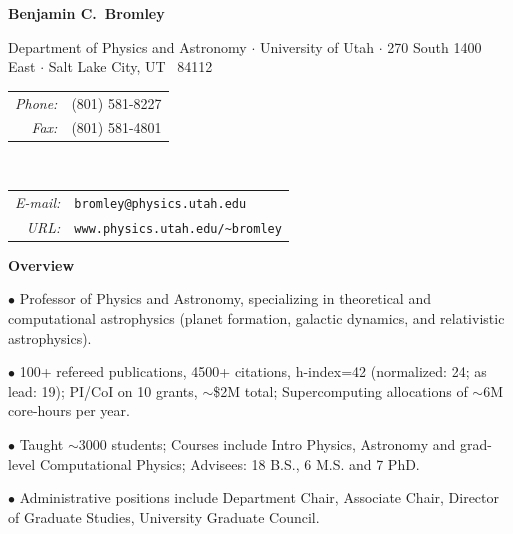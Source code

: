 \documentclass[11pt]{article}
\newcommand{\shead}[1]{\vspace{12.5pt}\centerline{{\bf{#1}}}}
\begin{document}
\vspace*{22pt}
\centerline{\large\bf Benjamin C.\ Bromley}

\vspace{-11pt}
\begin{center}
\footnotesize
Department of Physics and Astronomy $\cdot$
University of Utah
$\cdot$
270 South 1400 East $\cdot$
Salt Lake City, UT \ 84112

\vspace{-7.75pt}
\parbox[t]{1.5in}{
\begin{tabular}{rl}
{\it Phone:} & {(801) 581-8227}\\
{\it Fax:} & {(801) 581-4801}
\end{tabular}
}
\ \ \ \ \ 
\parbox[t]{3.0in}{
\begin{tabular}{rl}
{\it {E}-mail:} & {\small\tt bromley@physics.utah.edu}\\
{\it {URL}:} & {\small\tt www.physics.utah.edu/\~{}bromley}
\end{tabular}
}
\end{center}

\shead{Overview}

\hspace*{0.5in}
\begin{minipage}{5.5in}
\setlength{\parindent=-0.5in} \setlength{\leftmargin=1.0in}
$\bullet$ 
Professor of Physics and Astronomy, specializing in theoretical and
computational astrophysics (planet formation, galactic dynamics, and
relativistic astrophysics).

$\bullet$ 
100+ refereed publications, 4500+ citations, h-index=42 (normalized: 24; as lead: 19); %
PI/CoI on 10 grants, $\sim$\$2M total; Supercomputing allocations of
$\sim$6M core-hours per year.

$\bullet$ 
Taught $\sim$3000 students; Courses include Intro Physics, Astronomy
and grad-level Computational Physics; Advisees: 18 B.S., 6 M.S. and 7
PhD.

$\bullet$ Administrative positions
include Department Chair, Associate Chair, Director of Graduate Studies,
University Graduate Council.

\end{minipage}
\end{document}
